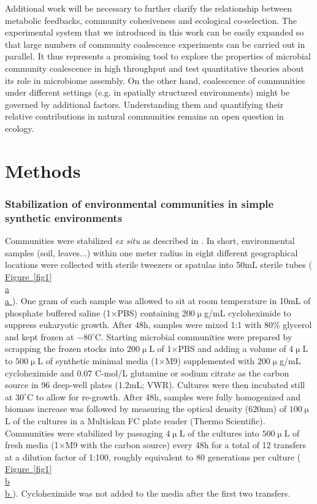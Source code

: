 \documentclass[a4paper,10pt]{article}
\newcommand{\figref}[2][]{%
  \hyperref[{#2}]{%
    Figure~\ref*{#2}%
    \ifx\\#1\\%
    \else
      #1%
    \fi
  }%
}
\begin{document}
Additional work will be necessary to further clarify the relationship between
metabolic feedbacks, community cohesiveness and ecological co-selection.
The experimental system that we introduced in this work can be easily expanded so that
large numbers of community coalescence experiments can be carried out in parallel.
It thus represents a promising tool to explore the properties of microbial community
coalescence in high throughput
and test quantitative theories about its role in microbiome assembly.
On the other hand, coalescence of communities under different settings
(e.g. in spatially structured environments)
might be governed by additional factors.
Understanding them and quantifying their relative contributions in natural communities
remains an open question in ecology.

\clearpage











\section*{Methods}\label{methods}

\subsubsection*{Stabilization of environmental communities in simple synthetic environments}
\label{methods:community-assembly}

Communities were stabilized \textit{ex situ} as described in \cite{Goldford2018}.
In short, environmental samples (soil, leaves...) within one meter radius in eight different
geographical locations were collected with sterile
tweezers or spatulas into 50mL sterile tubes (\figref[a]{fig1}).
One gram of each sample was allowed to
sit at room temperature in 10mL of phosphate buffered saline (1$\times$PBS) containing
200$\upmu$g/mL cycloheximide to suppress eukaryotic growth.
After 48h, samples were mixed 1:1 with 80\% glycerol and kept frozen at $-80^\circ$C.
Starting microbial communities were prepared by scrapping the frozen stocks into
$200\upmu$L of 1$\times$PBS and adding a volume of $4\upmu$L to $500\upmu$L
of synthetic minimal media (1$\times$M9) supplemented with $200\upmu$g/mL cycloheximide
and 0.07 C-mol/L glutamine or sodium citrate as the carbon source in 96 deep-well plates
(1.2mL; VWR).
Cultures were then incubated still at $30^\circ$C to allow for re-growth.
After 48h, samples were fully homogenized and biomass increase was followed by measuring
the optical density (620nm) of $100\upmu$L of the cultures in a Multiskan FC plate reader
(Thermo Scientific).
Communities were stabilized \cite{Goldford2018} by passaging $4\upmu$L of the cultures into
$500\upmu$L of fresh media (1$\times$M9 with the carbon source)  every 48h for a total of
12 transfers at a dilution factor of 1:100,
roughly equivalent to 80 generations per culture (\figref[b]{fig1}).
Cycloheximide was not added to the media after the first two transfers.
\end{document}
